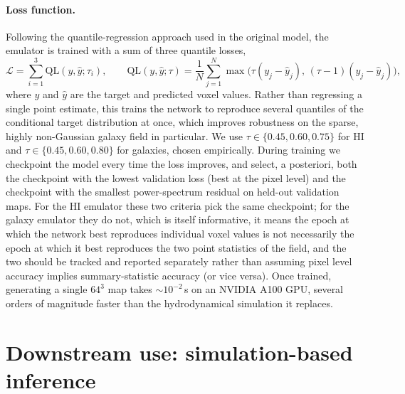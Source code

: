 \paragraph{Loss function.}
Following the quantile-regression approach used in the original \HALOgen
model, the emulator is trained with a sum of three quantile
losses,
\begin{equation}
    \mathcal{L} = \sum_{i=1}^{3} \mathrm{QL}(y, \hat{y}; \tau_i), \qquad
    \mathrm{QL}(y, \hat{y}; \tau) = \frac{1}{N}\sum_{j=1}^{N}
    \max\big(\tau (y_j - \hat{y}_j),\, (\tau - 1)(y_j - \hat{y}_j)\big),
\end{equation}
where $y$ and $\hat y$ are the target and predicted voxel values. Rather
than regressing a single point estimate, this trains the network to
reproduce several quantiles of the conditional target distribution at once,
which improves robustness on the sparse, highly non-Gaussian galaxy field in
particular. We use $\tau \in \{0.45, 0.60, 0.75\}$ for HI and
$\tau \in \{0.45, 0.60, 0.80\}$ for galaxies, chosen empirically. During
training we checkpoint the model every time the loss improves, and select,
a posteriori, both the checkpoint with the lowest validation loss (best at
the pixel level) and the checkpoint with the smallest power-spectrum
residual on held-out validation maps. For the HI emulator these two
criteria pick the same checkpoint; for the galaxy emulator they do not,
which is itself informative, it means the epoch at which the network best
reproduces individual voxel values is not necessarily the epoch at which it
best reproduces the two point statistics of the field, and the two should be
tracked and reported separately rather than assuming pixel level accuracy
implies summary-statistic accuracy (or vice versa). Once trained, generating
a single $64^3$ map takes $\sim 10^{-2}\,$s on an NVIDIA A100 GPU, several
orders of magnitude faster than the hydrodynamical simulation it replaces.

\section{Downstream use: simulation-based inference}
\label{sec:emu_sbi}

